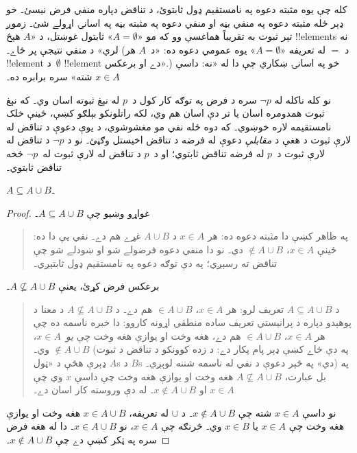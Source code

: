 \documentclass[../../../include/open-logic-section]{subfiles}
\begin{document}
کله چې يوه مثبته دعوه په نامستقيم ډول ثابتوئ، د
تناقض دپاره منفي فرض نيسئ۔ خو ډېر ځله مثبته دعوه په
منفي بڼه او منفي دعوه په مثبته بڼه په اسانۍ اړولے شئ۔
زموږ تېر ثبوت به تقريباً هماغسې وو که مو
«$A = \emptyset$» ثابتول غوښتل، د «$A$ هېڅ
!!{element}s نه لري» د منفي نتيجې پر ځاے۔
(د $=$ له تعريفه «$A = \emptyset$» يوه
عمومي دعوه ده: «د~$A$ هر !!{element} د~$\emptyset$
!!{element} دے او برعکس».) خو په اسانۍ ښکاري چې
دا له «نه: داسې $x \in A$ شته» سره برابره ده۔

نو کله ناکله له $\lnot p$ سره د فرض په توګه کار
کول د~$p$ له نېغ ثبوته اسان وي۔ که نېغ
ثبوت همدومره اسان يا تر دې اسان هم وي، لکه راتلونکو
بېلګو کښې، ځينې خلک نامستقيمه لاره خوښوي۔ که دوه
ځله نفي مو مغشوشوي، د يوې دعوې د تناقض له لارې ثبوت
د هغې د \emph{مقابلې} دعوې له فرضه د تناقض اخيستل وګڼئ۔
نو د $\lnot
p$ د تناقض له لارې ثبوت د~$p$ له فرضه تناقض
ثابتوي؛ او د~$p$ د تناقض له لارې ثبوت له~$\lnot p$
څخه تناقض ثابتوي۔

\begin{prop}
$A \subseteq A \cup B$۔
\end{prop}

\begin{proof}
  غواړو وښيو چې $A \subseteq A \cup B$۔
  \begin{quote}
    په ظاهر کښې دا مثبته دعوه ده: هر $x \in A$ د
    $A \cup B$ غړے هم دے۔ نفي يې دا ده: ځينې
    $x \in A$، $\notin A \cup B$ دي۔ نو دا منفي دعوه فرضولے شو
    او ښودلے شو چې تناقض ته رسېږي؛ په دې توګه دعوه
    په نامستقيم ډول ثابتېږي۔
    \end{quote}
  برعکس فرض کړئ، يعنې $A \nsubseteq A \cup B$۔
  \begin{quote}
    د $A \subseteq A \cup B$ تعريف لرو: هر $x \in A$،
    $\in A \cup B$ هم دے۔ د
    $A \nsubseteq A \cup B$ د معنا د پوهېدو دپاره
    د پرانيستي تعريف ساده منطقي اړونه کاروو: دا خبره
    ناسمه ده چې هر $x \in A$، $\in
    A \cup B$ هم دے، هغه وخت او يوازې هغه
    وخت چې \emph{يو}~$x \in A$، $\notin A \cup B$ وي۔
    (په دې ځاے کښې ډېر پام پکار دے:
    د زده کوونکو د تناقض د ثبوت ډېرې هڅې د «ټول
    $A$s د $B$s دي» په څېر دعوې د نفي له ناسمه
    شننه لوېږي۔) په بل عبارت،
    $A \nsubseteq A \cup B$ هغه وخت او يوازې هغه وخت
    چې داسې $x$ وي چې $x \in A$ او
    $x \notin A \cup B$۔ له دې وروسته کار اسان دے۔
  \end{quote}
  نو داسې $x \in A$ شته چې $x \notin A \cup B$۔
  د $\cup$ له تعريفه، $x \in A \cup B$ هغه وخت او
  يوازې هغه وخت چې $x \in A$ يا $x \in
  B$ وي۔ څرنګه چې $x \in A$، نو $x \in A \cup B$۔
  دا له هغه فرض سره په ټکر کښې دے چې
  $x \notin A \cup B$۔
\end{proof}
\end{document}
